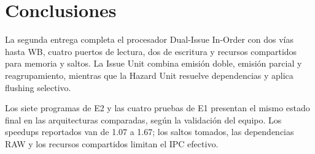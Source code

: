 \documentclass[12pt,a4paper]{article}
\begin{document}
\section{Conclusiones}

La segunda entrega completa el procesador Dual-Issue In-Order con dos vías hasta WB, cuatro puertos de lectura, dos de escritura y recursos compartidos para memoria y saltos. La Issue Unit combina emisión doble, emisión parcial y reagrupamiento, mientras que la Hazard Unit resuelve dependencias y aplica flushing selectivo.

Los siete programas de E2 y las cuatro pruebas de E1 presentan el mismo estado final en las arquitecturas comparadas, según la validación del equipo. Los speedups reportados van de 1.07 a 1.67; los saltos tomados, las dependencias RAW y los recursos compartidos limitan el IPC efectivo.
\end{document}
